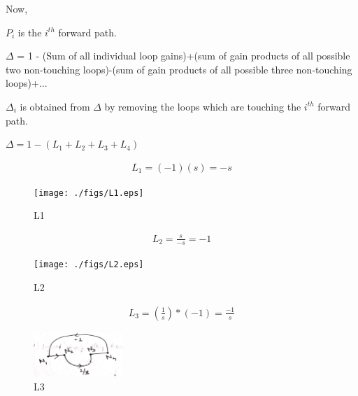 \begin{enumerate}[label=\thesection.\arabic*.,ref=\thesection.\theenumi]



Now, 

$P_i$ is the $i^{th}$ forward path.

$\Delta$ = 1 - (Sum of all individual loop gains)+(sum of gain products of all possible two non-touching loops)-(sum of gain products of all possible three non-touching loops)+...

$\Delta_i$ is  obtained from $\Delta$ by removing the loops which are touching the $i^{th}$ forward path.


$\Delta = 1-(L_1 + L_2 + L_3 + L_4)$

\begin{align}
L_1=(-1)(s)=-s
\end{align}

\begin{figure}[!ht]
\centering
\texttt{[image: ./figs/L1.eps]}
\caption{L1}
\label{fig:sec_order}
\end{figure}


\begin{align}
L_2=\frac{s}{-s}=-1
\end{align}

\begin{figure}[!ht]
\centering
\texttt{[image: ./figs/L2.eps]}
\caption{L2}
\label{fig:sec_order}
\end{figure}


\begin{align}
L_3=(\frac{1}{s})*(-1)=\frac{-1}{s}
\end{align}

\begin{figure}[!ht]
\centering
\includegraphics[width=0.3\textwidth]{./figs/L3.eps}
\caption{L3}
\label{fig:sec_order}
\end{figure}



\end{enumerate}
